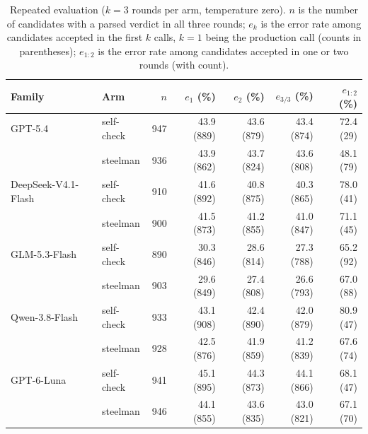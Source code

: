 \documentclass[a4paper,journal]{IAENGtran}
\begin{document}
\begin{table}[!t]
\centering
\caption{Repeated evaluation ($k{=}3$ rounds per arm, temperature zero).
$n$ is the number of candidates with a parsed verdict in all three rounds;
$e_k$ is the error rate among candidates accepted in the first $k$ calls,
$k{=}1$ being the production call (counts in parentheses); $e_{1:2}$ is the
error rate among candidates accepted in one or two rounds (with count).}
\label{tab:repeated}
\begin{tabular}{llrrrrr}
\hline
Family & Arm & $n$ & $e_1$ (\%) & $e_2$ (\%) & $e_{3/3}$ (\%) & $e_{1:2}$ (\%) \\
\hline
GPT-5.4 & self-check & 947 & 43.9 (889) & 43.6 (879) & 43.4 (874) & 72.4 (29) \\
 & steelman & 936 & 43.9 (862) & 43.7 (824) & 43.6 (808) & 48.1 (79) \\
DeepSeek-V4.1-Flash & self-check & 910 & 41.6 (892) & 40.8 (875) & 40.3 (865) & 78.0 (41) \\
 & steelman & 900 & 41.5 (873) & 41.2 (855) & 41.0 (847) & 71.1 (45) \\
GLM-5.3-Flash & self-check & 890 & 30.3 (846) & 28.6 (814) & 27.3 (788) & 65.2 (92) \\
 & steelman & 903 & 29.6 (849) & 27.4 (808) & 26.6 (793) & 67.0 (88) \\
Qwen-3.8-Flash & self-check & 933 & 43.1 (908) & 42.4 (890) & 42.0 (879) & 80.9 (47) \\
 & steelman & 928 & 42.5 (876) & 41.9 (859) & 41.2 (839) & 67.6 (74) \\
GPT-6-Luna & self-check & 941 & 45.1 (895) & 44.3 (873) & 44.1 (866) & 68.1 (47) \\
 & steelman & 946 & 44.1 (855) & 43.6 (835) & 43.0 (821) & 67.1 (70) \\
\hline
\end{tabular}
\end{table}
\end{document}
